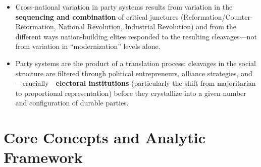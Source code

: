 \documentclass[12pt]{article}
\begin{document}
\begin{itemize}[leftmargin=*, itemsep=4pt]
    \item Cross-national variation in party systems results from variation in the \textbf{sequencing and combination} of critical junctures (Reformation/Counter-Reformation, National Revolution, Industrial Revolution) and from the different ways nation-building elites responded to the resulting cleavages---not from variation in ``modernization'' levels alone.
    \item Party systems are the product of a translation process: cleavages in the social structure are filtered through political entrepreneurs, alliance strategies, and---crucially---\textbf{electoral institutions} (particularly the shift from majoritarian to proportional representation) before they crystallize into a given number and configuration of durable parties.
\end{itemize}

\section{Core Concepts and Analytic Framework}
\end{document}
